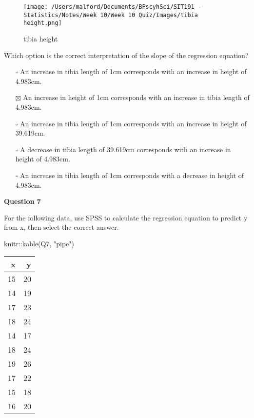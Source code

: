 \documentclass[
]{article}
\newenvironment{Shaded}{\begin{snugshade}}{\end{snugshade}}
\newcommand{\FunctionTok}[1]{\textcolor[rgb]{0.00,0.00,0.00}{#1}}
\newcommand{\NormalTok}[1]{#1}
\newcommand{\SpecialCharTok}[1]{\textcolor[rgb]{0.00,0.00,0.00}{#1}}
\newcommand{\StringTok}[1]{\textcolor[rgb]{0.31,0.60,0.02}{#1}}
\providecommand{\tightlist}{%
  \setlength{\itemsep}{0pt}\setlength{\parskip}{0pt}}
\begin{document}
\begin{figure}
\centering
\texttt{[image: /Users/malford/Documents/BPscyhSci/SIT191 - Statistics/Notes/Week 10/Week 10 Quiz/Images/tibia height.png]}
\caption{tibia height}
\end{figure}

Which option is the correct interpretation of the slope of the
regression equation?

\begin{itemize}
\tightlist
\item[$\square$]
  An increase in tibia length of 1cm corresponds with an increase in
  height of 4.983cm.
\item[$\boxtimes$]
  An increase in height of 1cm corresponds with an increase in tibia
  length of 4.983cm.
\item[$\square$]
  An increase in tibia length of 1cm corresponds with an increase in
  height of 39.619cm.
\item[$\square$]
  A decrease in tibia length of 39.619cm corresponds with an increase in
  height of 4.983cm.
\item[$\square$]
  An increase in tibia length of 1cm corresponds with a decrease in
  height of 4.983cm.
\end{itemize}

\textbf{Question 7}

For the following data, use SPSS to calculate the regression equation to
predict y from x, then select the correct answer.

\begin{Shaded}
\begin{Highlighting}[]
\NormalTok{knitr}\SpecialCharTok{::}\FunctionTok{kable}\NormalTok{(Q7, }\StringTok{"pipe"}\NormalTok{)}
\end{Highlighting}
\end{Shaded}

\begin{longtable}[]{@{}rr@{}}
\toprule
x & y \\
\midrule
\endhead
15 & 20 \\
14 & 19 \\
17 & 23 \\
18 & 24 \\
14 & 17 \\
18 & 24 \\
19 & 26 \\
17 & 22 \\
15 & 18 \\
16 & 20 \\
\bottomrule
\end{longtable}
\end{document}
